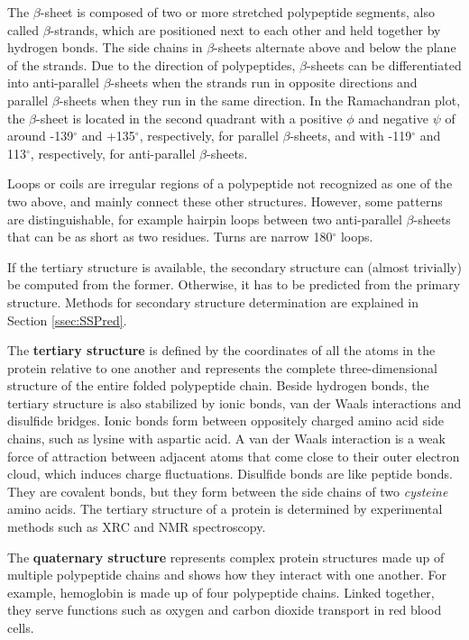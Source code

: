 The $\beta$-sheet is composed of two or more stretched polypeptide segments, also called $\beta$-strands, which are positioned next to each other and held together by hydrogen bonds. The side chains in $\beta$-sheets alternate above and below the plane of the strands.  Due to the direction of polypeptides, $\beta$-sheets can be differentiated into anti-parallel $\beta$-sheets when the strands run in opposite directions and parallel $\beta$-sheets when they run in the same direction. In the Ramachandran plot, the $\beta$-sheet is located in the second quadrant with a positive $\phi$ and negative $\psi$   of around  -139$^{\circ}$ and +135$^{\circ}$, respectively, for parallel $\beta$-sheets, and with -119$^{\circ}$ and 113$^{\circ}$, respectively, for anti-parallel $\beta$-sheets. 

Loops or coils are irregular regions of a polypeptide not recognized as one of the two above, and mainly connect these other structures. However, some patterns are distinguishable, for example hairpin loops between  two anti-parallel $\beta$-sheets that can be as short as two residues. Turns are narrow 180$^{\circ}$ loops.

If the tertiary structure is available, the secondary structure can (almost trivially) be computed from the former. Otherwise, it has to be predicted from the primary structure. Methods for secondary structure determination are explained in Section \ref{ssec:SSPred}.


The \textbf{tertiary structure} is defined by the coordinates of all the atoms in the protein relative to one another and represents the complete three-dimensional structure of the entire folded polypeptide chain. Beside hydrogen bonds, the tertiary structure is also stabilized by ionic bonds, van der Waals interactions and disulfide bridges. 
Ionic bonds form between oppositely charged amino acid side chains, such as lysine with aspartic acid.
A van der Waals interaction is a weak force of attraction between adjacent atoms that come close to their outer electron cloud, which induces charge fluctuations. Disulfide bonds are like peptide bonds. They are covalent bonds, but they form between the side chains of two \textit{cysteine} amino acids.
The tertiary structure of a protein is determined by experimental methods such as \ac{XRC}  and \ac{NMR} spectroscopy. 


The \textbf{quaternary structure} represents complex protein structures made up of multiple polypeptide chains and shows how they interact with one another. For example, hemoglobin is made up of four polypeptide chains. Linked together, they serve functions such as oxygen and carbon dioxide transport in red blood cells.




